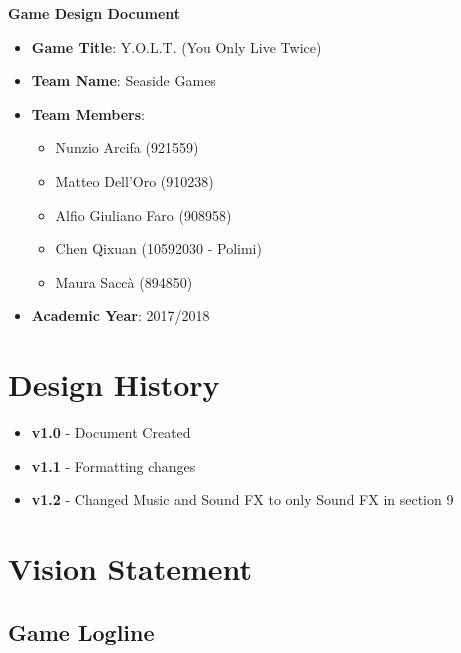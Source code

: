 \documentclass[12pt]{article}
\begin{document}
\begin{center}
	\vspace*{1cm}
	
	\textbf{Game Design Document}
	
	\vspace*{4cm}
	\begin{itemize}
		\item \textbf{Game Title}: Y.O.L.T. (You Only Live Twice)
		\item \textbf{Team Name}: Seaside Games
		\item \textbf{Team Members}:
		\begin{itemize}
			\item Nunzio Arcifa (921559)
			\item Matteo Dell'Oro (910238)
			\item Alfio Giuliano Faro (908958)
			\item Chen Qixuan (10592030 - Polimi)
			\item Maura Saccà (894850)
		\end{itemize}
		\item \textbf{Academic Year}: 2017/2018
	\end{itemize}
	
\end{center}

\newpage

\tableofcontents

\newpage

\section{Design History}

\begin{itemize}
	\item \textbf{v1.0} - Document Created
	\item \textbf{v1.1} - Formatting changes
	\item \textbf{v1.2} - Changed Music and Sound FX to only Sound FX in section 9
\end{itemize}

\newpage

\section{Vision Statement}

\subsection{Game Logline}
\end{document}
